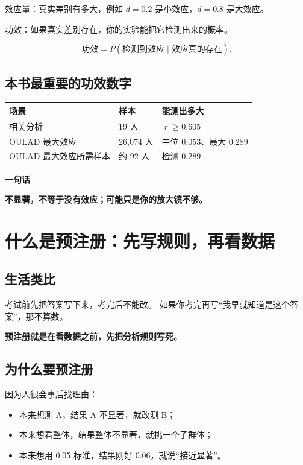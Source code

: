 \documentclass[UTF8,a4paper,11pt]{ctexart}
\newenvironment{explainbox}[1]
{\begin{center}\begin{minipage}{0.94\textwidth}\colorbox{boxbg}{\parbox{0.92\textwidth}{\textbf{#1}\par\vspace{2pt}}}}
{\end{minipage}\end{center}}
\begin{document}
效应量：真实差别有多大，例如 $d=0.2$ 是小效应，$d=0.8$ 是大效应。

功效：如果真实差别存在，你的实验能把它检测出来的概率。

\begin{equation}
\text{功效}=P(\text{检测到效应}\mid\text{效应真的存在}).
\end{equation}

\subsection{本书最重要的功效数字}

\begin{center}
\begin{longtable}{@{}p{5.0cm}p{4.0cm}p{4.0cm}@{}}
\toprule
\textbf{场景} & \textbf{样本} & \textbf{能测出多大} \\
\midrule
相关分析 & 19 人 & $|r|\ge0.605$ \\
OULAD 最大效应 & 26{,}074 人 & 中位 $0.053$、最大 $0.289$ \\
OULAD 最大效应所需样本 & 约 92 人 & 检测 $0.289$ \\
\bottomrule
\end{longtable}
\end{center}

\begin{explainbox}{一句话}
\textbf{不显著，不等于没有效应；可能只是你的放大镜不够。}
\end{explainbox}


\section{什么是预注册：先写规则，再看数据}

\subsection{生活类比}

考试前先把答案写下来，考完后不能改。
如果你考完再写“我早就知道是这个答案”，那不算数。

\textbf{预注册就是在看数据之前，先把分析规则写死。}

\subsection{为什么要预注册}

因为人很会事后找理由：

\begin{itemize}[leftmargin=2em]
\item 本来想测 A，结果 A 不显著，就改测 B；
\item 本来想看整体，结果整体不显著，就挑一个子群体；
\item 本来想用 0.05 标准，结果刚好 0.06，就说“接近显著”。
\end{itemize}
\end{document}
